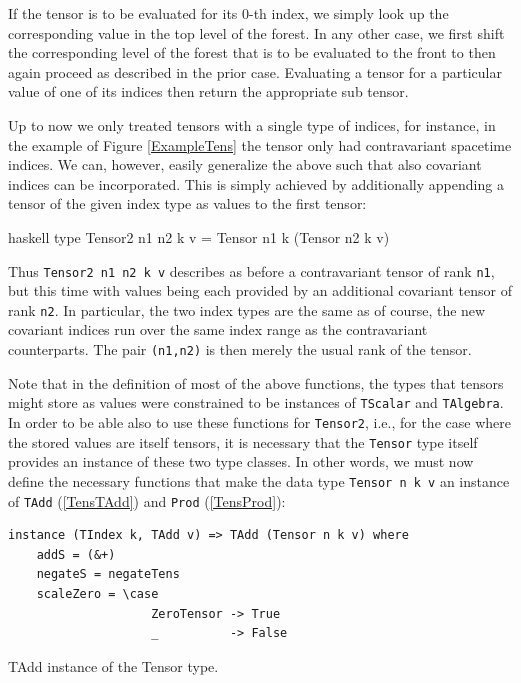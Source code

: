 \documentclass[a4paper,12pt, DIV=14, BCOR=5mm, twoside, headsepline, numbers=noenddot]{scrbook}
\begin{document}
If the tensor is to be evaluated for its 0-th index, we simply look up the corresponding value in the top level of the forest. In any other case, we first shift the corresponding level of the forest that is to be evaluated to the front to then again proceed as described in the prior case. Evaluating a tensor for a particular value of one of its indices then return the appropriate sub tensor. 

Up to now we only treated tensors with a single type of indices, for instance, in the example of Figure \ref{ExampleTens} the tensor only had contravariant spacetime indices. We can, however, easily generalize the above such that also covariant indices can be incorporated. This is simply achieved by additionally appending a tensor of the given index type as values
to the first tensor:
\begin{center}
\begin{cminted}{haskell}
type Tensor2 n1 n2 k v = Tensor n1 k (Tensor n2 k v)
\end{cminted}
\end{center}
Thus \texttt{Tensor2 n1 n2 k v} describes as before a contravariant tensor of rank \texttt{n1}, but this time with values being each provided by an additional covariant tensor of rank \texttt{n2}. In particular, the two index types are the same as of course, the new covariant indices run over the same index range as the contravariant counterparts. The pair \texttt{(n1,n2)} is then merely the usual rank of the tensor.

Note that in the definition of most of the above functions, the types that tensors might store as values were constrained to be instances of \texttt{TScalar} and \texttt{TAlgebra}. 
In order to be able also to use these functions for  \texttt{Tensor2}, i.e., for the case where the stored values are itself tensors, it is necessary that the \texttt{Tensor} type itself provides an instance of these two type classes. In other words, we must now define the necessary functions that make the data type
\texttt{Tensor n k v} an instance of \texttt{TAdd} (\ref{TensTAdd}) and \texttt{Prod} (\ref{TensProd}):

\begin{listing}[hbt!] 
\begin{verbatim}
instance (TIndex k, TAdd v) => TAdd (Tensor n k v) where
    addS = (&+)
    negateS = negateTens
    scaleZero = \case
                    ZeroTensor -> True
                    _          -> False
\end{verbatim}
\caption{TAdd instance of the Tensor type.}\label{TensTAdd}
\end{listing}
\end{document}

